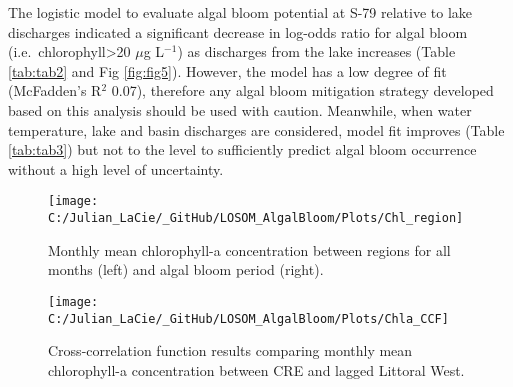 \documentclass[]{interact}
\theoremstyle{plain}%
\theoremstyle{definition}
\theoremstyle{remark}
\begin{document}
The logistic model to evaluate algal bloom potential at S-79 relative to
lake discharges indicated a significant decrease in log-odds ratio for
algal bloom (i.e.~chlorophyll\textgreater20 \(\mu\)g L\(^{-1}\)) as
discharges from the lake increases (Table \ref{tab:tab2} and Fig
\ref{fig:fig5}). However, the model has a low degree of fit (McFadden's
R\(^{2}\) 0.07), therefore any algal bloom mitigation strategy developed
based on this analysis should be used with caution. Meanwhile, when
water temperature, lake and basin discharges are considered, model fit
improves (Table \ref{tab:tab3}) but not to the level to sufficiently
predict algal bloom occurrence without a high level of uncertainty.

\begin{figure}[H]
\texttt{[image: C:/Julian\_LaCie/\_GitHub/LOSOM\_AlgalBloom/Plots/Chl\_region]} \caption{\label{fig:fig3} Monthly mean chlorophyll-a concentration between regions for all months (left) and algal bloom period (right).}\label{fig:unnamed-chunk-5}
\end{figure}

\begin{figure}[H]

{\centering \texttt{[image: C:/Julian\_LaCie/\_GitHub/LOSOM\_AlgalBloom/Plots/Chla\_CCF]} 

}

\caption{\label{fig:fig4}Cross-correlation function results comparing monthly mean chlorophyll-a concentration between CRE and lagged Littoral West. }\label{fig:unnamed-chunk-6}
\end{figure}

\providecommand{\docline}[3]{\noalign{\global\setlength{\arrayrulewidth}{#1}}\arrayrulecolor[HTML]{#2}\cline{#3}}

\setlength{\tabcolsep}{2pt}

\renewcommand*{\arraystretch}{1.5}
\end{document}
